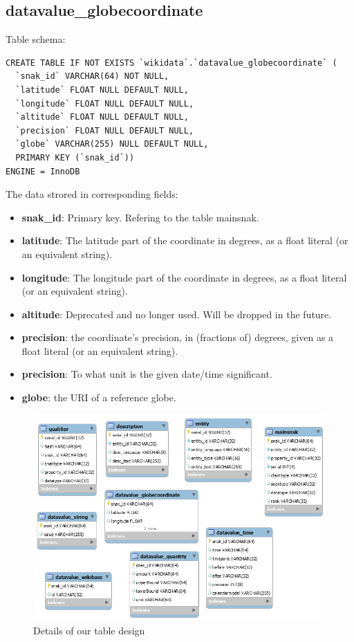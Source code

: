 \documentclass[12pt]{article}
\begin{document}
\subsection{datavalue\_globecoordinate}
\lstset{language=SQL}
Table schema:
\begin{lstlisting}
CREATE TABLE IF NOT EXISTS `wikidata`.`datavalue_globecoordinate` (
  `snak_id` VARCHAR(64) NOT NULL,
  `latitude` FLOAT NULL DEFAULT NULL,
  `longitude` FLOAT NULL DEFAULT NULL,
  `altitude` FLOAT NULL DEFAULT NULL,
  `precision` FLOAT NULL DEFAULT NULL,
  `globe` VARCHAR(255) NULL DEFAULT NULL,
  PRIMARY KEY (`snak_id`))
ENGINE = InnoDB
\end{lstlisting}
The data strored in corresponding fields:
\begin{itemize}
\item \textbf{snak\_id}: Primary key. Refering to the table mainsnak.
\item \textbf{latitude}: The latitude part of the coordinate in degrees, as a float literal (or an equivalent string).
\item \textbf{longitude}: The longitude part of the coordinate in degrees, as a float literal (or an equivalent string).
\item \textbf{altitude}: Deprecated and no longer used. Will be dropped in the future.
\item \textbf{precision}: the coordinate's precision, in (fractions of) degrees, given as a float literal (or an equivalent string).
\item \textbf{precision}: To what unit is the given date/time significant.
\item \textbf{globe}: the URI of a reference globe.
\end{itemize}
\begin{figure}
\centering
\label{fig:2}
\includegraphics[width=0.8\linewidth]{datadetail.png}
\caption{Details of our table design}
\end{figure}
\end{document}

